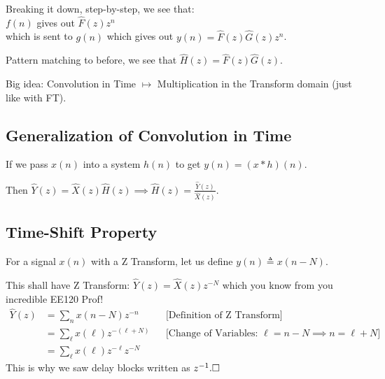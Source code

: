Breaking it down, step-by-step, we see that:\\
$f(n)$ gives out $\hat F(z)z^n$\\
which is sent to $g(n)$ which gives out $y(n)=\hat F(z)\hat G(z) z^n$.

Pattern matching to before, we see that $\hat H(z)=\hat F(z)\hat G(z)$.

\begin{shaded}
Big idea: Convolution in Time $\mapsto$ Multiplication in the Transform domain (just like with FT).
\end{shaded}

\subsection{ Generalization of Convolution in Time}
If we pass $x(n)$ into a system $h(n)$ to get $y(n)=(x\ast h)(n)$.

Then $\hat Y(z) = \hat X(z)\hat H(z)\implies \hat H(z)=\frac{\hat Y(z)}{\hat X(z)}$.

\subsection{ Time-Shift Property}
For a signal $x(n)$ with a Z Transform, let us define $y(n)\triangleq x(n-N)$.

This shall have Z Transform: $\hat Y(z)=\hat X(z)z^{-N}$ which you know from you incredible EE120 Prof!
\begin{align*}
    \hat Y(z)
    &= \sum_{n} x(n-N) z^{-n}
    &&\text{[Definition of Z Transform]}
    \\
    &= \sum_{\ell} x(\ell) z^{-(\ell+N)}
    &&\text{[Change of Variables: $\ell=n-N\implies n=\ell+N$]}
    \\
    &= \sum_{\ell} x(\ell) z^{-\ell} z^{-N }
\end{align*}
This is why we saw delay blocks written as $z^{-1}.\hfill\square$
